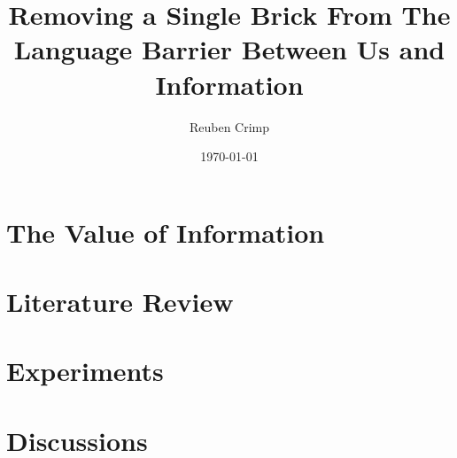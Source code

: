 \documentclass[12pt]{report}
\title{Removing a Single Brick From The Language Barrier Between Us and Information}
\author{Reuben Crimp}
\date{\today}
\begin{document}
    \frontstuff
    
    \linespread{1.3} \normalsize
    
    \part{The Value of Information}
        
        
    
    \part{Literature Review}
        
        
        
    
    \part{Experiments}
        
        
        
    
    \part{Discussions}
        
        
    
    \cleardoublepage
    
    
    
\end{document}
